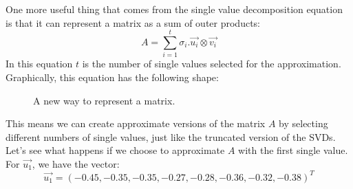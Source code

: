 \documentclass[a4,12pt,twosided,openany]{memoir}
\begin{document}
One more useful thing that comes from the single value decomposition equation is that it can represent a matrix as a sum of outer products:
\[A = \sum_{i=1}^t \sigma_i. \overrightarrow{u_i} \otimes \overrightarrow{v_i}\]
\indent In this equation $t$ is the number of single values selected for the approximation. Graphically, this equation has the following shape:
\newpage
\begin{figure}[h!]
\begin{center}
\end{center}
\caption{A new way to represent a matrix.}
\end{figure}

This means we can create approximate versions of the matrix $A$ by selecting different numbers of single values, just like the truncated version of the SVDs. Let’s see what happens if we choose to approximate $A$ with the first single value. For $\overrightarrow{u_1}$, we have the vector:
\[ \overrightarrow{u_1} = (-0.45, -0.35, -0.35, -0.27, -0.28, -0.36, -0.32, -0.38 )^T \]
\end{document}
